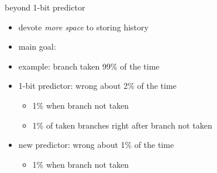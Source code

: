 \usetikzlibrary{arrows.meta,chains,decorations,decorations.pathreplacing,matrix}

\begin{frame}{beyond 1-bit predictor}
    \begin{itemize}
    \item devote \textit{more space} to storing history
    \item main goal: 
    \vspace{.5cm}
    \item example: branch taken 99\% of the time
    \item 1-bit predictor: wrong about 2\% of the time
        \begin{itemize}
        \item 1\% when branch not taken
        \item 1\% of taken branches right after branch not taken
        \end{itemize}
    \item new predictor: wrong about 1\% of the time
        \begin{itemize}
        \item 1\% when branch not taken
        \end{itemize}
    \end{itemize}
\end{frame}

